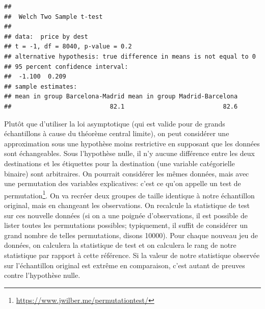 \documentclass[
  11pt,
  letterpaper,
]{book}
\renewcommand{\href}[2]{#2\footnote{\url{#1}}}
\begin{document}
\begin{verbatim}
## 
## 	Welch Two Sample t-test
## 
## data:  price by dest
## t = -1, df = 8040, p-value = 0.2
## alternative hypothesis: true difference in means is not equal to 0
## 95 percent confidence interval:
##  -1.100  0.209
## sample estimates:
## mean in group Barcelona-Madrid mean in group Madrid-Barcelona 
##                           82.1                           82.6
\end{verbatim}

Plutôt que d'utiliser la loi asymptotique (qui est valide pour de grands échantillons à cause du théorème central limite), on peut considérer une approximation sous une hypothèse moins restrictive en supposant que les données sont échangeables. Sous l'hypothèse nulle, il n'y aucune différence entre les deux destinations et les étiquettes pour la destination (une variable catégorielle binaire) sont arbitraires. On pourrait considérer les mêmes données, mais avec une permutation des variables explicatives: c'est ce qu'on appelle un \href{https://www.jwilber.me/permutationtest/}{test de permutation}. On va recréer deux groupes de taille identique à notre échantillon original, mais en changeant les observations. On recalcule la statistique de test sur ces nouvelle données (si on a une poignée d'observations, il est possible de lister toutes les permutations possibles; typiquement, il suffit de considérer un grand nombre de telles permutations, disons 10000). Pour chaque nouveau jeu de données, on calculera la statistique de test et on calculera le rang de notre statistique par rapport à cette référence. Si la valeur de notre statistique observée sur l'échantillon original est extrême en comparaison, c'est autant de preuves contre l'hypothèse nulle.
\end{document}
